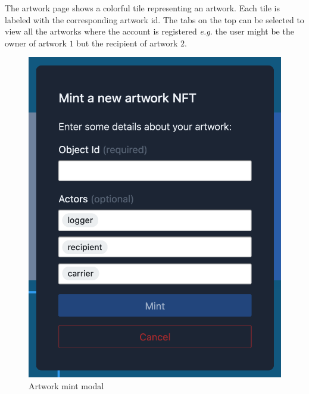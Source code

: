 The artwork page shows a colorful tile representing an artwork. Each tile is labeled with the corresponding artwork \gls{id}. The tabs on the top can be selected to view all the artworks where the account is registered \textit{e.g.} the user might be the owner of artwork $1$ but the recipient of artwork $2$. 

\begin{figure}
    \centering
    \begin{minipage}{0.45\textwidth}
        \centering
        \includegraphics[height=0.4\textheight]{resources/frontend_screenshots/mint_modal.png}
        \caption{Artwork mint modal}
        \label{fig:mint_modal}
    \end{minipage}\hfill
    \begin{minipage}{0.45\textwidth}
        \centering

\end{minipage}
\end{figure}
